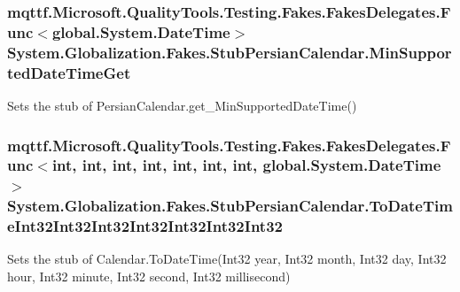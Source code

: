 \hypertarget{class_system_1_1_globalization_1_1_fakes_1_1_stub_persian_calendar_a806cc6ba27d019fe5e1fea5c21f98923}{
\subsubsection[{Min\-Supported\-Date\-Time\-Get}]{\setlength{\rightskip}{0pt plus 5cm}mqttf.\-Microsoft.\-Quality\-Tools.\-Testing.\-Fakes.\-Fakes\-Delegates.\-Func$<$global.\-System.\-Date\-Time$>$ System.\-Globalization.\-Fakes.\-Stub\-Persian\-Calendar.\-Min\-Supported\-Date\-Time\-Get}}\label{class_system_1_1_globalization_1_1_fakes_1_1_stub_persian_calendar_a806cc6ba27d019fe5e1fea5c21f98923}


Sets the stub of Persian\-Calendar.\-get\-\_\-\-Min\-Supported\-Date\-Time()

\hypertarget{class_system_1_1_globalization_1_1_fakes_1_1_stub_persian_calendar_a645703f04fc140cbdd9e574ba7a401a7}{
\subsubsection[{To\-Date\-Time\-Int32\-Int32\-Int32\-Int32\-Int32\-Int32\-Int32}]{\setlength{\rightskip}{0pt plus 5cm}mqttf.\-Microsoft.\-Quality\-Tools.\-Testing.\-Fakes.\-Fakes\-Delegates.\-Func$<$int, int, int, int, int, int, int, global.\-System.\-Date\-Time$>$ System.\-Globalization.\-Fakes.\-Stub\-Persian\-Calendar.\-To\-Date\-Time\-Int32\-Int32\-Int32\-Int32\-Int32\-Int32\-Int32}}\label{class_system_1_1_globalization_1_1_fakes_1_1_stub_persian_calendar_a645703f04fc140cbdd9e574ba7a401a7}


Sets the stub of Calendar.\-To\-Date\-Time(\-Int32 year, Int32 month, Int32 day, Int32 hour, Int32 minute, Int32 second, Int32 millisecond)


